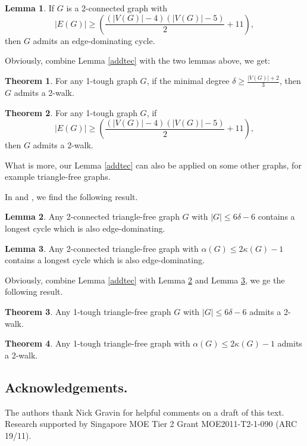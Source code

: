\documentclass{amsart}
\theoremstyle{definition}
\newtheorem{theorem}{Theorem}
\newtheorem{lemma}{Lemma}
\begin{document}
\begin{lemma}\label{2conxiaoe}{\cite[Corollary 3.3.1]{veldman83}}
If $G$ is a 2-connected graph with $$|E(G)|\ge(\frac{(|V(G)|-4)(|V(G)|-5)}{2}+11),$$ then $G$ admits an edge-dominating cycle.
\end{lemma}

Obviously, combine Lemma \ref{addtec} with the two lemmas above, we get:

\begin{theorem}\label{mdeg2w}
For any 1-tough graph $G$, if the minimal degree $\delta\ge\frac{|V(G)|+2}{3}$, then $G$ admits a 2-walk.
\end{theorem}


\begin{theorem}
For any 1-tough graph $G$, if $$|E(G)|\ge(\frac{(|V(G)|-4)(|V(G)|-5)}{2}+11),$$ then $G$ admits a 2-walk.
\end{theorem}



What is more, our Lemma \ref{addtec} can also be applied on some other graphs, for example triangle-free graphs.

In \cite{aung1989longest} and \cite{ozeki2011dominating}, we find the following result.
\begin{lemma}\cite[Corollary 1.4]{aung1989longest}\label{lm89tr}
Any 2-connected triangle-free graph $G$ with $|G|\le6\delta-6$ contains a longest cycle which is also edge-dominating.
\end{lemma}

\begin{lemma}\cite[Theorem 6]{ozeki2011dominating}\label{lm11tr}
Any 2-connected triangle-free graph with $\alpha(G)\le2\kappa(G)-1$ contains a longest cycle which is also edge-dominating.
\end{lemma}

Obviously, combine Lemma \ref{addtec} with Lemma \ref{lm89tr} and Lemma \ref{lm11tr}, we ge the following result.
\begin{theorem}
Any 1-tough triangle-free graph $G$ with  $|G|\le6\delta-6$ admits a 2-walk.
\end{theorem}

\begin{theorem}
Any 1-tough triangle-free graph with  $\alpha(G)\le2\kappa(G)-1$ admits a 2-walk.
\end{theorem}

\fi

\subsection*{Acknowledgements.}
The authors thank Nick Gravin
for helpful comments on a draft of this text.
Research supported by Singapore MOE Tier 2 Grant MOE2011-T2-1-090 (ARC 19/11). 



%
\end{document}
